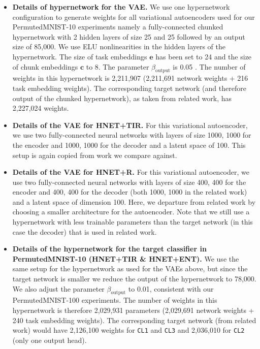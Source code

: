 \documentclass{article}
\begin{document}
\begin{itemize}
    \item \textbf{Details of hypernetwork for the VAE.} \label{apx:hnet_config_vae}
    We use one hypernetwork configuration to generate weights for all variational autoencoders used for our PermutedMNIST-10 experiments namely a fully-connected chunked hypernetwork with 2 hidden layers of size 25 and 25 followed by an output size of 85,000. We use ELU nonlinearities in the hidden layers of the hypernetwork. The size of task embeddings $\mathbf{e}$ has been set to 24 and the size of chunk embeddings $\mathbf{c}$ to 8. The parameter $\beta_\text{output}$ is 0.05
. The number of weights in this hypernetwork  is 2,211,907 (2,211,691 network weights + 216 task embedding weights). The corresponding target network (and therefore output of the chunked hypernetwork), as taken from related work, has 2,227,024 weights.
    
    \item \textbf{Details of the VAE for HNET+TIR.} 
    For this variational  autoencoder, we use two
    fully-connected neural networks with layers of size 
    1000, 1000 for the encoder and 1000, 1000 for the decoder and a latent space of 100. This setup is again copied from work we compare against.
   
    \item \textbf{Details of the VAE for HNET+R.} For this variational autoencoder, we use two fully-connected neural networks with layers of size 
    400, 400 for the encoder and 400, 400 for the decoder (both 1000, 1000 in the related work) and a latent space of dimension 100. Here, we departure from related work by choosing a smaller architecture for the autoencoder. Note that we still use a hypernetwork with less trainable parameters than the target network (in this case the decoder) that is used in related work. 
    
     \item \textbf{Details of the hypernetwork for the target classifier in PermutedMNIST-10 (HNET+TIR \& HNET+ENT).}
     We use the same setup for the hypernetwork as used for the VAEs above, but since the target network is smaller we reduce the output of the hypernetwork to 78,000. We also adjust 
     the parameter $\beta_\text{output}$ to 0.01, consistent with our PermutedMNIST-100 experiments.
      The number of weights in this hypernetwork is therefore 2,029,931 parameters (2,029,691 network weights + 240 task embedding weights). The corresponding target network (from related work) would have 2,126,100 weights for  \texttt{CL1} and  \texttt{CL3} and 2,036,010 for  \texttt{CL2} (only one output head).
     

\end{itemize}
\end{document}
